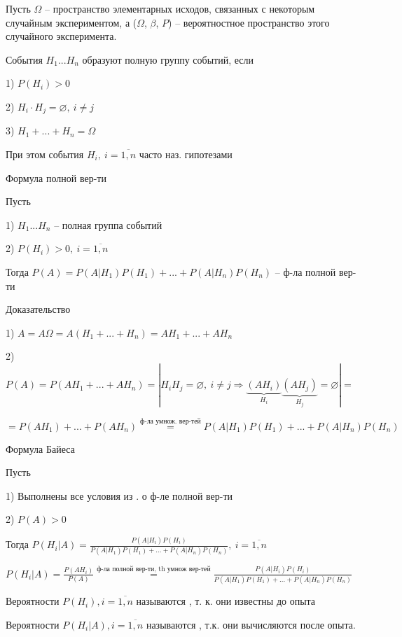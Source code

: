 
Пусть $\Omega$ -- пространство элементарных исходов, связанных с некоторым случайным экспериментом, а ($\Omega$, $\beta$, $P$) -- вероятностное пространство этого случайного эксперимента.

\OPR События $H_1...H_n$ образуют полную группу событий, если

1) $P(H_i) > 0$

2) $H_i\cdot H_j = \varnothing, ~ i\neq j$

3) $H_1+...+H_n=\Omega$

\ZAM При этом события $H_i,~i=\overline{1,n}$ часто наз. гипотезами

\THRM Формула полной вер-ти

Пусть

1) $H_1...H_n$ -- полная группа событий 

2) $P(H_i)>0,~i=\overline{1,n}$

Тогда $P(A)=P(A|H_1)P(H_1)+...+P(A|H_n)P(H_n)$ -- ф-ла полной вер-ти

Доказательство

1) $A = A\Omega = A(H_1+...+H_n) = AH_1+...+AH_n$

2) $P(A)=P(AH_1+...+AH_n)=\left|H_iH_j=\varnothing,~i\neq j\Rightarrow\underbrace{(AH_i)}_{H_i}\underbrace{(AH_j)}_{H_j}=\varnothing\right| =$

$= P(AH_1)+...+P(AH_n)\stackrel{\text{ф-ла умнож. вер-тей}}{=} P(A|H_1)P(H_1)+...+P(A|H_n)P(H_n)$\newline

\THRM Формула Байеса

Пусть

1) Выполнены все условия из . о ф-ле полной вер-ти

2) $P(A) > 0$

Тогда $P(H_i|A)=\tfrac{P(A|H_i)P(H_i)}{P(A|H_1)P(H_1)+...+P(A|H_n)P(H_n)},~i=\overline{1,n}$\newline


$P(H_i|A)=\tfrac{P(AH_i)}{P(A)}\stackrel{\text{ф-ла полной вер-ти, th умнож вер-тей}}{=} \tfrac{P(A|H_i)P(H_i)}{P(A|H_1)P(H_1)+...+P(A|H_n)P(H_n)}$\newline

Вероятности $P(H_i),i=\overline{1,n}$ называются , т. к. они известны до опыта

Вероятности $P(H_i|A),i=\overline{1,n}$ называются , т.к. они вычисляются
после опыта.





\clearpage
